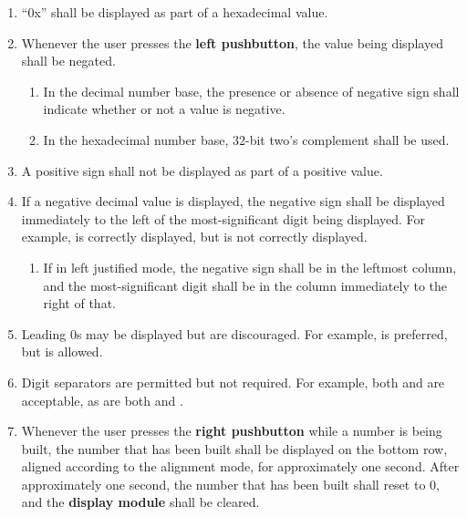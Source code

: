 \begin{enumerate}
\begin{enumerate}
\begin{enumerate}
            \end{enumerate}
        \item ``0x'' shall be displayed as part of a hexadecimal value.
        \item Whenever the user presses the \textbf{left pushbutton}, the value
            being displayed shall be negated.
            \begin{enumerate}
                \item In the decimal number base, the presence or absence of negative sign shall indicate whether or not a value is negative.
                \item In the hexadecimal number base, 32-bit two's complement shall be used.
            \end{enumerate}
        \item A positive sign shall not be displayed as part of a positive value.
        \item If a negative decimal value is displayed, the negative sign shall be displayed immediately to the left of the most-significant digit being displayed.
            For example,  is correctly displayed, but  is not correctly displayed.
            \begin{enumerate}
                \item If in left justified mode, the negative sign shall be in the leftmost column, and the most-significant digit shall be in the column immediately to the right of that.
            \end{enumerate}
        \item Leading 0s may be displayed but are discouraged.
            For example,  is preferred, but  is allowed.
        \item Digit separators are permitted but not required.
            For example, both  and  are acceptable, as are both  and .
        \item \label{spec:clearNumber} Whenever the user presses the \textbf{right pushbutton} while a number is being built, the number that has been built shall be displayed on the bottom row, aligned according to the alignment mode, for approximately one second.
            After approximately one second, the number that has been built shall reset to 0, and the \textbf{display module} shall be cleared.

\end{enumerate}
\end{enumerate}
